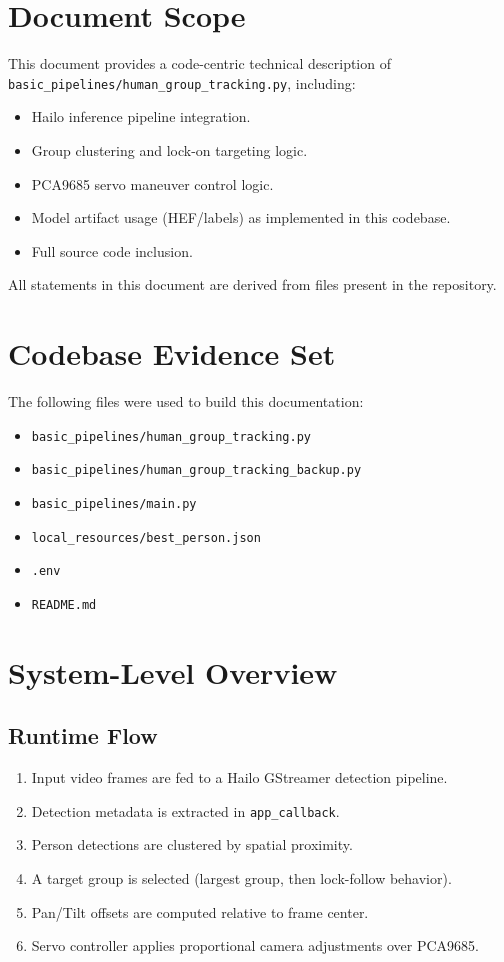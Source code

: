 \documentclass[11pt,a4paper]{article}
\author{Repository: \texttt{hailo-rpi5-examples}}
\date{\today}
\begin{document}
\maketitle
\tableofcontents
\newpage
\n\section{Document Scope}
This document provides a code-centric technical description of \texttt{basic\_pipelines/human\_group\_tracking.py}, including:
\begin{itemize}[leftmargin=*]
  \item Hailo inference pipeline integration.
  \item Group clustering and lock-on targeting logic.
  \item PCA9685 servo maneuver control logic.
  \item Model artifact usage (HEF/labels) as implemented in this codebase.
  \item Full source code inclusion.
\end{itemize}

All statements in this document are derived from files present in the repository.

\section{Codebase Evidence Set}
The following files were used to build this documentation:
\begin{itemize}[leftmargin=*]
  \item \texttt{basic\_pipelines/human\_group\_tracking.py}
  \item \texttt{basic\_pipelines/human\_group\_tracking\_backup.py}
  \item \texttt{basic\_pipelines/main.py}
  \item \texttt{local\_resources/best\_person.json}
  \item \texttt{.env}
  \item \texttt{README.md}
\end{itemize}

\section{System-Level Overview}
\subsection{Runtime Flow}
\begin{enumerate}[leftmargin=*]
  \item Input video frames are fed to a Hailo GStreamer detection pipeline.
  \item Detection metadata is extracted in \texttt{app\_callback}.
  \item Person detections are clustered by spatial proximity.
  \item A target group is selected (largest group, then lock-follow behavior).
  \item Pan/Tilt offsets are computed relative to frame center.
  \item Servo controller applies proportional camera adjustments over PCA9685.
\end{enumerate}
\end{document}
